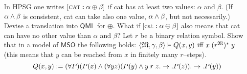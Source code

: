 \vplatz
\exercise
In HPSG one writes $[\mbox{\sc cat} : \alpha \oplus \beta]$ if 
{\sc cat} has at least two values: $\alpha$ and $\beta$. (If 
$\alpha\wedge\beta$ is consistent, {\sc cat} can take also one 
value, $\alpha\wedge\beta$, but not necessarily.) Devise a 
translation into $\mathsf{QML}$ for $\oplus$. What if $[\mbox{\rm cat} 
: \alpha\oplus\beta]$ also means that {\sc cat} can have no other 
value than $\alpha$ and $\beta$?
\vplatz
\exercise
\label{ex:transclose}
Let $r$ be a binary relation symbol. Show that in a model of
$\mathsf{MSO}$ the following holds:
$\langle \mathfrak{M}, \gamma, \beta\rangle \vDash Q(x,y)$ iff
$x \; (r^{\mathfrak{M}})^{\ast}\; y$ (this means that $y$ can be reached from
$x$ in finitely many $r$--steps).
\begin{equation}
Q(x,y) := (\forall P)(P(x) \wedge (\forall yz)(P(y) \wedge
    y\; r\; z .\rightarrow .P(z)). \rightarrow . P(y))
\end{equation}
